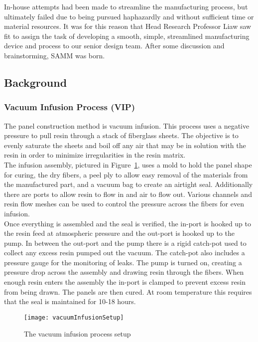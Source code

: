 \documentclass[12pt,letterpaper,notitlepage]{article}
\begin{document}
In-house attempts had been made to streamline the manufacturing process, but ultimately failed due to being pursued haphazardly and without sufficient time or material resources. It was for this reason that Head Research Professor Liaw saw fit to assign the task of developing a smooth, simple, streamlined manufacturing device and process to our senior design team. After some discussion and brainstorming, SAMM was born.\\

\subsection{Background}
\subsubsection{Vacuum Infusion Process (VIP)}
The panel construction method is vacuum infusion. This process uses a negative pressure to pull resin through a stack of fiberglass sheets. The objective is to evenly saturate the sheets and boil off any air that may be in solution with the resin in order to minimize irregularities in the resin matrix.\\

The infusion assembly, pictured in Figure~\ref{fig:VIPSetup}, uses a mold to hold the panel shape for curing, the dry fibers, a peel ply to allow easy removal of the materials from the manufactured part, and a vacuum bag to create an airtight seal. Additionally there are ports to allow resin to flow in and air to flow out. Various channels and resin flow meshes can be used to control the pressure across the fibers for even infusion.\\

Once everything is assembled and the seal is verified, the in-port is hooked up to the resin feed at atmospheric pressure and the out-port is hooked up to the pump.  In between the out-port and the pump there is a rigid catch-pot used to collect any excess resin pumped out the vacuum. The catch-pot also includes a pressure gauge for the monitoring of leaks. The pump is turned on, creating a pressure drop across the assembly and drawing resin through the fibers. When enough resin enters the assembly the in-port is clamped to prevent excess resin from being drawn. The panels are then cured. At room temperature this requires that the seal is maintained for 10-18 hours.\\

\begin{figure}[hpbt]
\centering
\texttt{[image: vacuumInfusionSetup]}
\label{fig:VIPSetup}
\caption{The vacuum infusion process setup}
\end{figure}
\end{document}
